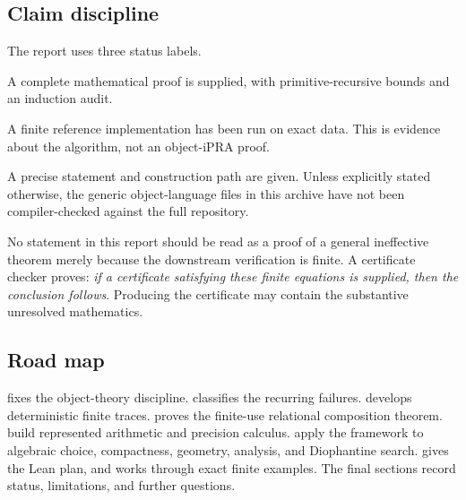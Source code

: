 \subsection{Claim discipline}

The report uses three status labels.

\begin{description}[style=nextline]
\item[Human theorem.] A complete mathematical proof is supplied, with primitive-recursive bounds and an induction audit.
\item[Semantic executable.] A finite reference implementation has been run on exact data.  This is evidence about the algorithm, not an object-iPRA proof.
\item[Embedded target.] A precise  statement and construction path are given.  Unless explicitly stated otherwise, the generic object-language files in this archive have not been compiler-checked against the full repository.
\end{description}

No statement in this report should be read as a proof of a general ineffective theorem merely because the downstream verification is finite.  A certificate checker proves: \emph{if a certificate satisfying these finite equations is supplied, then the conclusion follows}.  Producing the certificate may contain the substantive unresolved mathematics.

\subsection{Road map}

 fixes the object-theory discipline.   classifies the recurring failures.   develops deterministic finite traces.   proves the finite-use relational composition theorem.   build represented arithmetic and precision calculus.   apply the framework to algebraic choice, compactness, geometry, analysis, and Diophantine search.   gives the Lean plan, and  works through exact finite examples.  The final sections record status, limitations, and further questions.
